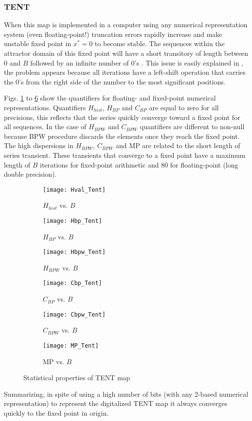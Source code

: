 \subsubsection{TENT} \label{sssec:tent}

When this map is implemented in a computer using any numerical representation system (even floating-point!) truncation errors rapidly increase and make unstable fixed point in $x^*=0$ to become stable.
The sequences within the attractor domain of this fixed point will have a short transitory of length between $0$ and $B$ followed by an infinite number of $0$'s \cite{Jessa2002,Callegari}.
This issue is easily explained in \cite{Li2004}, the problem appears because all iterations have a left-shift operation that carries the $0$'s from the right side of the number to the most significant positions.

Figs. \ref{fig:Hval_Tent} to \ref{fig:MP_Tent} show the quantifiers for floating- and fixed-point numerical representations.
Quantifiers $H_{hist}$, $H_{BP}$ and $C_{BP}$ are equal to zero for all precisions, this reflects that the series quickly converge toward a fixed point for all sequences.
In the case of $H_{BPW}$ and $C_{BPW}$ quantifiers are different to non-null because BPW procedure discards the elements once they reach the fixed point.
The high dispersions in $H_{BPW}$, $C_{BPW}$ and MP are related to the short length of series transient.
These transients that converge to a fixed point have a maximum length of $B$ iterations for fixed-point arithmetic and $80$ for floating-point (long double precision).

\begin{figure}[htpb]
	\centering
	\begin{subfigure}[b]{0.49\textwidth}
		\texttt{[image: Hval\_Tent]}
		\caption{$H_{hist}$ vs. $B$}
		\label{fig:Hval_Tent}
	\end{subfigure}
	\begin{subfigure}[b]{0.49\textwidth}
		\texttt{[image: Hbp\_Tent]}
		\caption{$H_{BP}$ vs. $B$}
		\label{fig:Hbp_Tent}
	\end{subfigure}
	\begin{subfigure}[b]{0.49\textwidth}
		\texttt{[image: Hbpw\_Tent]}
		\caption{$H_{BPW}$ vs. $B$}
		\label{fig:Hbpw_Tent}
	\end{subfigure}
	\begin{subfigure}[b]{0.49\textwidth}
		\texttt{[image: Cbp\_Tent]}
		\caption{$C_{BP}$ vs. $B$}
		\label{fig:Cbp_Tent}
	\end{subfigure}
	\begin{subfigure}[b]{0.49\textwidth}
		\texttt{[image: Cbpw\_Tent]}
		\caption{$C_{BPW}$ vs. $B$}
		\label{fig:Cbpw_Tent}
	\end{subfigure}
	\begin{subfigure}[b]{0.49\textwidth}
		\texttt{[image: MP\_Tent]}
		\caption{MP vs. $B$}
		\label{fig:MP_Tent}
	\end{subfigure}
	\caption{Statistical properties of TENT map}
	\label{fig:TENT_QuantiB}
\end{figure}

Summarizing, in spite of using a high number of bits (with any 2-based numerical representation) to represent the digitalized TENT map it always converges quickly to the fixed point in origin.
